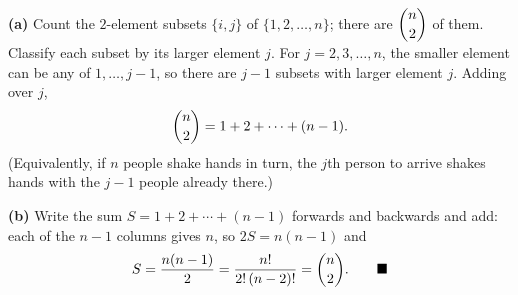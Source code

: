 \textbf{(a)} Count the $2$-element subsets $\{i,j\}$ of $\{1,2,\dots,n\}$; there are $\dbinom n2$ of them. Classify each subset by its larger element $j$. For $j=2,3,\dots,n$, the smaller element can be any of $1,\dots,j-1$, so there are $j-1$ subsets with larger element $j$. Adding over $j$,
\[
\dbinom n2=1+2+\cdots+(n-1).
\]
(Equivalently, if $n$ people shake hands in turn, the $j$th person to arrive shakes hands with the $j-1$ people already there.)

\textbf{(b)} Write the sum $S=1+2+\cdots+(n-1)$ forwards and backwards and add: each of the $n-1$ columns gives $n$, so $2S=n(n-1)$ and
\[
S=\dfrac{n(n-1)}{2}=\dfrac{n!}{2!\,(n-2)!}=\dbinom n2. \qquad\blacksquare
\]
